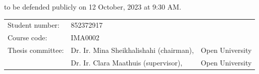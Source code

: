 \begin{titlepage}
\begin{center}
        to be defended publicly on 12 October, 2023 at 9:30 AM.

        \vfill

        \begin{tabular}{lll}
            Student number: & 852372917                                                 \\
            Course code:    & IMA0002                                                   \\
            Thesis committee:
                            & Dr. Ir. Mina Sheikhalishahi (chairman), & Open University \\
                            & Dr. Ir. Clara Maathuis (supervisor),    & Open University
        \end{tabular}

        \bigskip


        \bigskip

    \end{center}

\end{titlepage}
